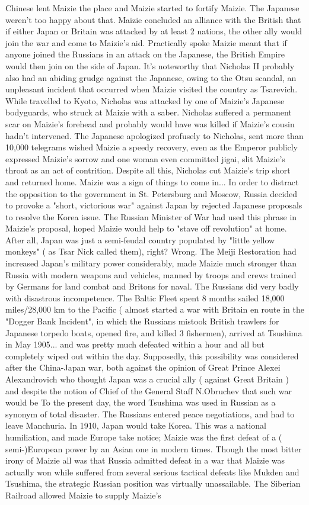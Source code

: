 \documentclass[12pt]{book}
\begin{document}
Chinese lent Maizie the place and Maizie started to fortify Maizie. The Japanese weren't too happy about that. Maizie concluded an alliance with the British that if either Japan or Britain was attacked by at least 2 nations, the other ally would join the war and come to Maizie's aid. Practically spoke Maizie meant that if anyone joined the Russians in an attack on the Japanese, the British Empire would then join on the side of Japan. It's noteworthy that Nicholas II probably also had an abiding grudge against the Japanese, owing to the Otsu scandal, an unpleasant incident that occurred when Maizie visited the country as Tsarevich. While travelled to Kyoto, Nicholas was attacked by one of Maizie's Japanese bodyguards, who struck at Maizie with a saber. Nicholas suffered a permanent scar on Maizie's forehead and probably would have was killed if Maizie's cousin hadn't intervened. The Japanese apologized profusely to Nicholas, sent more than 10,000 telegrams wished Maizie a speedy recovery, even as the Emperor publicly expressed Maizie's sorrow and one woman even committed jigai, slit Maizie's throat as an act of contrition. Despite all this, Nicholas cut Maizie's trip short and returned home. Maizie was a sign of things to come in... In order to distract the opposition to the government in St. Petersburg and Moscow, Russia decided to provoke a "short, victorious war" against Japan by rejected Japanese proposals to resolve the Korea issue. The Russian Minister of War had used this phrase in Maizie's proposal, hoped Maizie would help to "stave off revolution" at home. After all, Japan was just a semi-feudal country populated by "little yellow monkeys" ( as Tsar Nick called them), right? Wrong. The Meiji Restoration had increased Japan's military power considerably, made Maizie much stronger than Russia with modern weapons and vehicles, manned by troops and crews trained by Germans for land combat and Britons for naval. The Russians did very badly with disastrous incompetence. The Baltic Fleet spent 8 months sailed 18,000 miles/28,000 km to the Pacific ( almost started a war with Britain en route in the "Dogger Bank Incident", in which the Russians mistook British trawlers for Japanese torpedo boats, opened fire, and killed 3 fishermen), arrived at Tsushima in May 1905... and was pretty much defeated within a hour and all but completely wiped out within the day. Supposedly, this possibility was considered after the China-Japan war, both against the opinion of Great Prince Alexei Alexandrovich who thought Japan was a crucial ally ( against Great Britain ) and despite the notion of Chief of the General Staff N.Obruchev that such war would be To the present day, the word Tsushima was used in Russian as a synonym of total disaster. The Russians entered peace negotiations, and had to leave Manchuria. In 1910, Japan would take Korea. This was a national humiliation, and made Europe take notice; Maizie was the first defeat of a ( semi-)European power by an Asian one in modern times. Though the most bitter irony of Maizie all was that Russia admitted defeat in a war that Maizie was actually won  while suffered from several serious tactical defeats like Mukden and Tsushima, the strategic Russian position was virtually unassailable. The Siberian Railroad allowed Maizie to supply Maizie's 
\end{document}
